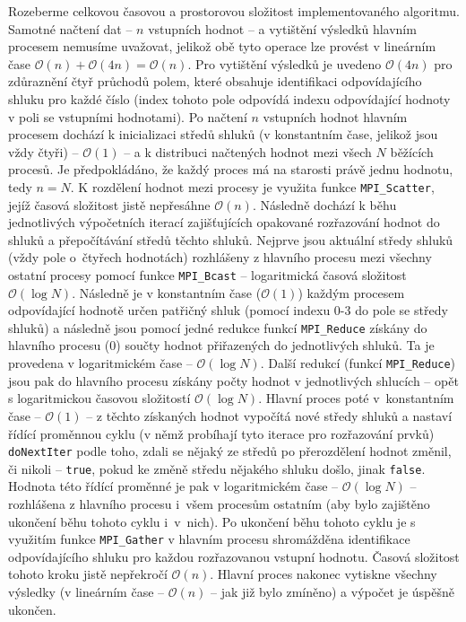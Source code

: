 \documentclass[a4paper]{article}
\newcommand{\bigO}[1]{\mathcal{O}(#1)}
\begin{document}
Rozeberme celkovou časovou a prostorovou složitost implementovaného algoritmu. Samotné načtení dat -- $n$ vstupních hodnot -- a vytištění výsledků hlavním procesem nemusíme uvažovat, jelikož obě tyto operace lze provést v lineárním čase $\bigO{n} + \bigO{4n} = \bigO{n}$. Pro vytištění výsledků je uvedeno $\bigO{4n}$ pro zdůraznění čtyř průchodů polem, které obsahuje identifikaci odpovídajícího shluku pro každé číslo (index tohoto pole odpovídá indexu odpovídající hodnoty v poli se vstupními hodnotami). Po načtení $n$ vstupních hodnot hlavním procesem dochází k inicializaci středů shluků (v konstantním čase, jelikož jsou vždy čtyři) -- $\bigO{1}$ -- a k distribuci načtených hodnot mezi všech $N$ běžících procesů. Je předpokládáno, že každý proces má na starosti právě jednu hodnotu, tedy $n = N$. K rozdělení hodnot mezi procesy je využita funkce \verb|MPI_Scatter|, jejíž časová složitost jistě nepřesáhne $\bigO{n}$. Následně dochází k běhu jednotlivých výpočetních iterací zajišťujících opakované rozřazování hodnot do shluků a přepočítávání středů těchto shluků. Nejprve jsou aktuální středy shluků (vždy pole o~čtyřech hodnotách) rozhlášeny z hlavního procesu mezi všechny ostatní procesy pomocí funkce \verb|MPI_Bcast| -- logaritmická časová složitost $\bigO{\log N}$. Následně je v konstantním čase ($\bigO{1}$) každým procesem odpovídající hodnotě určen patřičný shluk (pomocí indexu $0$-$3$ do pole se středy shluků) a následně jsou pomocí jedné redukce funkcí \verb|MPI_Reduce| získány do hlavního procesu ($0$) součty hodnot přiřazených do jednotlivých shluků. Ta je provedena v logaritmickém čase -- $\bigO{\log N}$. Další redukcí (funkcí \verb|MPI_Reduce|) jsou pak do hlavního procesu získány počty hodnot v jednotlivých shlucích -- opět s logaritmickou časovou složitostí $\bigO{\log N}$. Hlavní proces poté v~konstantním čase -- $\bigO{1}$ -- z těchto získaných hodnot vypočítá nové středy shluků a nastaví řídící proměnnou cyklu (v němž probíhají tyto iterace pro rozřazování prvků) \verb|doNextIter| podle toho, zdali se nějaký ze středů po přerozdělení hodnot změnil, či nikoli -- \verb|true|, pokud ke změně středu nějakého shluku došlo, jinak \verb|false|. Hodnota této řídící proměnné je pak v logaritmickém čase -- $\bigO{\log N}$ -- rozhlášena z hlavního procesu i~všem procesům ostatním (aby bylo zajištěno ukončení běhu tohoto cyklu i~v~nich). Po ukončení běhu tohoto cyklu je s využitím funkce \verb|MPI_Gather| v hlavním procesu shromážděna identifikace odpovídajícího shluku pro každou rozřazovanou vstupní hodnotu. Časová složitost tohoto kroku jistě nepřekročí $\bigO{n}$. Hlavní proces nakonec vytiskne všechny výsledky (v lineárním čase -- $\bigO{n}$ -- jak již bylo zmíněno) a výpočet je úspěšně ukončen.
\end{document}
